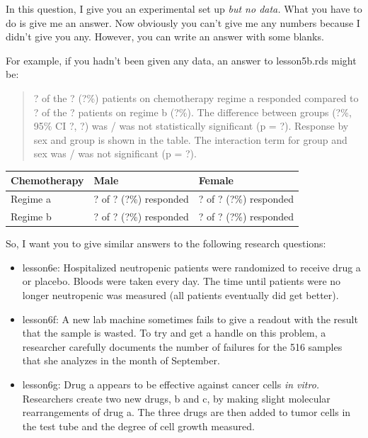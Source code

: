 \documentclass[]{book}
\begin{document}
In this question, I give you an experimental set up \emph{but no data.}
What you have to do is give me an answer. Now obviously you can't give
me any numbers because I didn't give you any. However, you can write an
answer with some blanks.

For example, if you hadn't been given any data, an answer to
lesson5b.rds might be:

\begin{quote}
? of the ? (?\%) patients on chemotherapy regime a responded compared to
? of the ? patients on regime b (?\%). The difference between groups
(?\%, 95\% CI ?, ?) was / was not statistically significant (p = ?).
Response by sex and group is shown in the table. The interaction term
for group and sex was / was not significant (p = ?).
\end{quote}

\captionsetup[table]{labelformat=empty,skip=1pt}
\begin{longtable}{lll}
\toprule
Chemotherapy & Male & Female \\ 
\midrule
Regime a & ? of ? (?\%) responded & ? of ? (?\%) responded \\ 
Regime b & ? of ? (?\%) responded & ? of ? (?\%) responded \\ 
\bottomrule
\end{longtable}

So, I want you to give similar answers to the following research
questions:

\begin{itemize}
\item
  lesson6e: Hospitalized neutropenic patients were randomized to receive
  drug a or placebo. Bloods were taken every day. The time until
  patients were no longer neutropenic was measured (all patients
  eventually did get better).
\item
  lesson6f: A new lab machine sometimes fails to give a readout with the
  result that the sample is wasted. To try and get a handle on this
  problem, a researcher carefully documents the number of failures for
  the 516 samples that she analyzes in the month of September.
\item
  lesson6g: Drug a appears to be effective against cancer cells \emph{in
  vitro.} Researchers create two new drugs, b and c, by making slight
  molecular rearrangements of drug a. The three drugs are then added to
  tumor cells in the test tube and the degree of cell growth measured.
\end{itemize}
\end{document}
